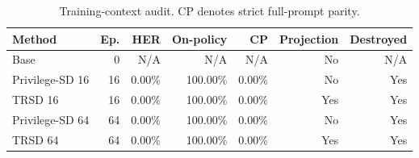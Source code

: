 \begin{table}[t]
\centering
\small
\caption{Training-context audit. CP denotes strict full-prompt parity.}
\label{tab:trsd-cleanliness}
\begin{tabular}{lrrrrrr}
\toprule
Method & Ep. & HER & On-policy & CP & Projection & Destroyed \\
\midrule
Base & 0 & N/A & N/A & N/A & No & N/A \\
Privilege-SD 16 & 16 & 0.00\% & 100.00\% & 0.00\% & No & Yes \\
TRSD 16 & 16 & 0.00\% & 100.00\% & 0.00\% & Yes & Yes \\
Privilege-SD 64 & 64 & 0.00\% & 100.00\% & 0.00\% & No & Yes \\
TRSD 64 & 64 & 0.00\% & 100.00\% & 0.00\% & Yes & Yes \\
\bottomrule
\end{tabular}
\end{table}
